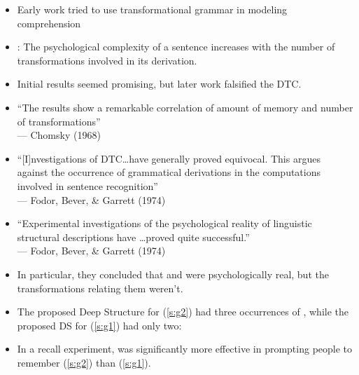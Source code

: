 \documentclass[a4paper,landscape,headrule,footrule,dvips]{foils}
\begin{document}


\begin{itemize}
\item Early work tried to use transformational grammar in 
modeling comprehension
\item {}:  The 
psychological complexity of a sentence increases 
with the number of transformations involved in its 
derivation.
\item Initial results seemed promising, but later work 
falsified the DTC.
\end{itemize}



\begin{itemize}
\item “The results show a remarkable correlation of 
amount of memory and number of transformations” 
\\ \mbox{} \hfill ---  Chomsky (1968)
\item “[I]nvestigations of DTC…have generally proved 
equivocal.  This argues against the occurrence of 
grammatical derivations in the computations 
involved in sentence recognition”                              
\\ \mbox{} \hfill --- Fodor, Bever, \& Garrett (1974)
\end{itemize}



\begin{itemize}
\item “Experimental investigations of the 
psychological reality of linguistic structural 
descriptions have \ldots proved quite successful.”                                        
\\ \mbox{} \hfill --- Fodor, Bever, \& Garrett (1974)
\item In particular, they concluded that  and  were 
psychologically real, but the transformations 
relating them weren’t.
\end{itemize}



\begin{itemize}
\item The proposed Deep Structure for (\ref{s:g2}) had three
  occurrences of , while the proposed DS for (\ref{s:g1})
  had only two:
\begin{exe}
  \ex \label{s:g1} 
  \ex \label{s:g2} 
\end{exe}
\item In a recall experiment,  was significantly more 
effective in prompting people to remember (\ref{s:g2}) than (\ref{s:g1}). 
\end{itemize}
\end{document}
